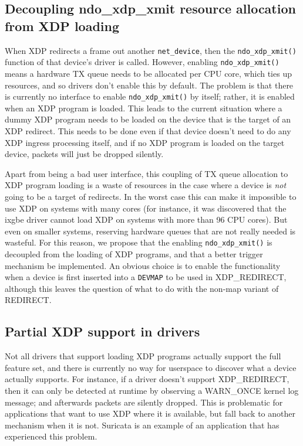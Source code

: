 \documentclass[sigconf]{acmart}
\begin{document}
\subsection{Decoupling ndo\_xdp\_xmit resource allocation from XDP loading}
\label{sec:decoupling-ndo-xdp-xmit}

When XDP redirects a frame out another \texttt{net\_device}, then the
\texttt{ndo\_xdp\_xmit()} function of that device's driver is called. However,
enabling \texttt{ndo\_xdp\_xmit()} means a hardware TX queue needs to be
allocated per CPU core, which ties up resources, and so drivers don't enable
this by default. The problem is that there is currently no interface to enable
\texttt{ndo\_xdp\_xmit()} by itself; rather, it is enabled when an XDP program
is loaded. This leads to the current situation where a dummy XDP program needs
to be loaded on the device that is the target of an XDP redirect. This needs to
be done even if that device doesn't need to do any XDP ingress processing
itself, and if no XDP program is loaded on the target device, packets will just
be dropped silently.

Apart from being a bad user interface, this coupling of TX queue allocation to
XDP program loading is a waste of resources in the case where a device is
\emph{not} going to be a target of redirects. In the worst case this can make it
impossible to use XDP on systems with many cores (for instance, it was
discovered that the ixgbe driver cannot load XDP on systems with more than 96
CPU cores). But even on smaller systems, reserving hardware queues that are not
really needed is wasteful. For this reason, we propose that the enabling
\texttt{ndo\_xdp\_xmit()} is decoupled from the loading of XDP programs, and
that a better trigger mechanism be implemented. An obvious choice is to enable
the functionality when a device is first inserted into a \texttt{DEVMAP} to be
used in XDP\_REDIRECT, although this leaves the question of what to do with the
non-map variant of REDIRECT.

\subsection{Partial XDP support in drivers}
\label{sec:partial-xdp-support}

Not all drivers that support loading XDP programs actually support the full
feature set, and there is currently no way for userspace to discover what a
device actually supports. For instance, if a driver doesn't support
XDP\_REDIRECT, then it can only be detected at runtime by observing a WARN\_ONCE
kernel log message; and afterwards packets are silently dropped. This is
problematic for applications that want to use XDP where it is available, but
fall back to another mechanism when it is not. Suricata is an example of an
application that has experienced this problem.
\end{document}
